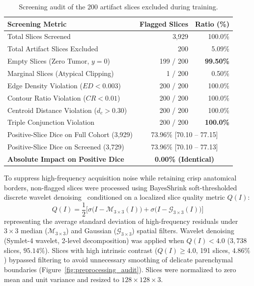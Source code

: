\documentclass[preprint,12pt,authoryear]{elsarticle}
\begin{document}
\begin{table}[tbp]
\centering
\caption{Screening audit of the 200 artifact slices excluded during training.}
\label{tab:screening_audit}
\setlength{\tabcolsep}{8pt}
\small
\begin{tabular*}{\textwidth}{@{\extracolsep{\fill}}lrr}
\toprule
\textbf{Screening Metric} & \textbf{Flagged Slices} & \textbf{Ratio (\%)} \\
\midrule
Total Slices Screened & 3,929 & 100.0\% \\
Total Artifact Slices Excluded & 200 & 5.09\% \\
\midrule
\hspace{1.2em}Empty Slices (Zero Tumor, $y=0$) & 199 / 200 & \textbf{99.50\%} \\
\hspace{1.2em}Marginal Slices (Atypical Clipping) & 1 / 200 & 0.50\% \\
\hspace{1.2em}Edge Density Violation ($ED < 0.003$) & 200 / 200 & 100.0\% \\
\hspace{1.2em}Contour Ratio Violation ($CR < 0.01$) & 200 / 200 & 100.0\% \\
\hspace{1.2em}Centroid Distance Violation ($d_c > 0.30$) & 200 / 200 & 100.0\% \\
\hspace{1.2em}Triple Conjunction Violation & 200 / 200 & \textbf{100.0\%} \\
\midrule
Positive-Slice Dice on Full Cohort (3,929) & \multicolumn{2}{c}{73.96\% [70.10 -- 77.15]} \\
Positive-Slice Dice on Screened (3,729) & \multicolumn{2}{c}{73.96\% [70.10 -- 77.13]} \\
\textbf{Absolute Impact on Positive Dice} & \multicolumn{2}{c}{\textbf{0.00\% (Identical)}} \\
\bottomrule
\end{tabular*}
\end{table}

To suppress high-frequency acquisition noise while retaining crisp anatomical borders, non-flagged slices were processed using BayesShrink soft-thresholded discrete wavelet denoising~\citep{chang2000adaptive} conditioned on a localized slice quality metric $Q(I)$:
\begin{equation}
Q(I) = \frac{1}{2}\Big[\sigma\big(I - \mathcal{M}_{3\times 3}(I)\big) + \sigma\big(I - \mathcal{G}_{3\times 3}(I)\big)\Big]
\end{equation}
representing the average standard deviation of high-frequency residuals under $3 \times 3$ median ($\mathcal{M}_{3\times 3}$) and Gaussian ($\mathcal{G}_{3\times 3}$) spatial filters. Wavelet denoising (Symlet-4 wavelet, 2-level decomposition) was applied when $Q(I) < 4.0$ ($3,738$ slices, $95.14\%$). Slices with high intrinsic contrast ($Q(I) \ge 4.0$, 191 slices, $4.86\%$) bypassed filtering to avoid unnecessary smoothing of delicate parenchymal boundaries (Figure~\ref{fig:preprocessing_audit}). Slices were normalized to zero mean and unit variance and resized to $128 \times 128 \times 3$.
\end{document}
